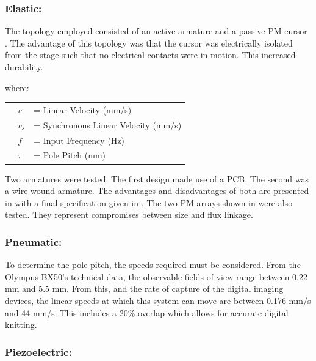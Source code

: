 \documentclass[10pt,twocolumn]{witseiepaper}
\begin{document}
\subsubsection*{Elastic:}

The topology employed consisted of an active armature and a passive PM
cursor \cite{Linsync}.  The advantage of this topology was that the cursor was
electrically isolated from the stage such that no electrical contacts were in
motion.  This increased durability.


where:

\begin{tabular}{lll}
& $v$      & = Linear Velocity (mm/s)\\
& $v_s$    & = Synchronous Linear Velocity (mm/s)\\
& $f$      & = Input Frequency (Hz)\\
& $\tau$   & = Pole Pitch (mm) \\
\end{tabular}

Two armatures were tested.  The first design made use of a PCB.  The second
was a wire-wound armature.  The advantages and disadvantages of both are
presented in  with a final specification given in
.  The two PM arrays shown in  were also
tested.  They represent compromises between size and flux linkage.

\subsubsection*{Pneumatic:}

To determine the pole-pitch, the speeds required must be considered.  From the
Olympus BX50's technical data, the observable fields-of-view range between
0.22 mm and 5.5 mm.  From this, and the rate of capture of the digital imaging
devices, the linear speeds at which this system can move are between 0.176
mm/s and 44 mm/s.  This includes a 20\% overlap which allows for accurate
digital knitting.

\subsubsection*{Piezoelectric:}
\end{document}
